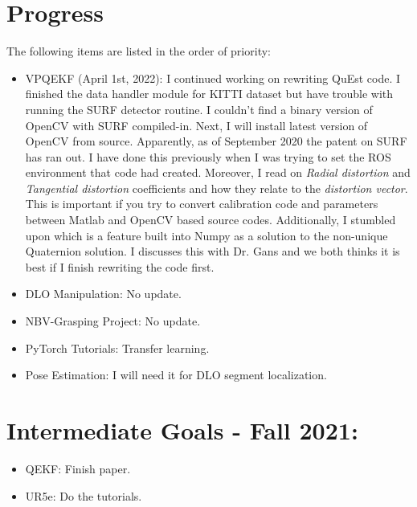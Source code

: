\documentclass[11pt]{article}
\begin{document}
\section{Progress}
The following items are listed in the order of priority:
\begin{itemize}
      \item VPQEKF (April 1st, 2022): I continued working on rewriting QuEst
      code. I finished the data handler module for KITTI dataset but have trouble
      with running the SURF detector routine. I couldn't find a binary version
      of OpenCV with SURF compiled-in. Next, I will install latest version of
      OpenCV from source. Apparently, as of September 2020 the patent on SURF
      has ran out. I have done this previously when I was trying to set the ROS
      environment that code had created. Moreover, I read on \emph{Radial distortion} and
      \emph{Tangential distortion} coefficients and how they relate to the
      \emph{distortion vector}. This is important if you try to convert
      calibration code and parameters between Matlab and OpenCV based source
      codes. Additionally, I stumbled upon \cite{bar2000new} which is a feature
      built into Numpy as a solution to the non-unique Quaternion solution. I
      discusses this with Dr. Gans and we both thinks it is best if I finish
      rewriting the code first.
      \item DLO Manipulation: No update.
      \item NBV-Grasping Project: No update.
      \item PyTorch Tutorials: Transfer learning.
      \item Pose Estimation: I will need it for DLO segment localization.
\end{itemize}

\section{Intermediate Goals - Fall 2021:}
\begin{itemize}
      \item QEKF: Finish paper.
      \item UR5e: Do the tutorials.
\end{itemize}

\newpage

\newpage


\end{document}
